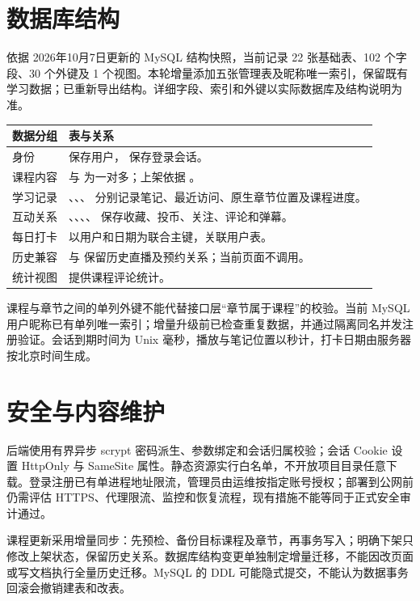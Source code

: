 \documentclass[UTF8,12pt,a4paper,openany,oneside]{ctexbook}
\begin{document}
\section{数据库结构}
依据 2026年10月7日更新的 MySQL 结构快照，当前记录 22 张基础表、102 个字段、30 个外键及 1 个视图。本轮增量添加五张管理表及昵称唯一索引，保留既有学习数据；已重新导出结构。详细字段、索引和外键以实际数据库及结构说明为准。
{\small
\begin{longtable}{P{0.20\textwidth}P{0.67\textwidth}}
\toprule 数据分组 & 表与关系 \\ \midrule
身份 &  保存用户， 保存登录会话。 \\
课程内容 &  与  为一对多；上架依据 。 \\
学习记录 & 、、、 分别记录笔记、最近访问、原生章节位置及课程进度。 \\
互动关系 & 、、、、 保存收藏、投币、关注、评论和弹幕。 \\
每日打卡 &  以用户和日期为联合主键，关联用户表。 \\
历史兼容 &  与  保留历史直播及预约关系；当前页面不调用。 \\
统计视图 &  提供课程评论统计。 \\
\bottomrule
\end{longtable}}
课程与章节之间的单列外键不能代替接口层“章节属于课程”的校验。当前 MySQL 用户昵称已有单列唯一索引；增量升级前已检查重复数据，并通过隔离同名并发注册验证。会话到期时间为 Unix 毫秒，播放与笔记位置以秒计，打卡日期由服务器按北京时间生成。

\section{安全与内容维护}
后端使用有界异步 scrypt 密码派生、参数绑定和会话归属校验；会话 Cookie 设置 HttpOnly 与 SameSite 属性。静态资源实行白名单，不开放项目目录任意下载。登录注册已有单进程地址限流，管理员由运维按指定账号授权；部署到公网前仍需评估 HTTPS、代理限流、监控和恢复流程，现有措施不能等同于正式安全审计通过。

课程更新采用增量同步：先预检、备份目标课程及章节，再事务写入；明确下架只修改上架状态，保留历史关系。数据库结构变更单独制定增量迁移，不能因改页面或写文档执行全量历史迁移。MySQL 的 DDL 可能隐式提交，不能认为数据事务回滚会撤销建表和改表。
\end{document}
